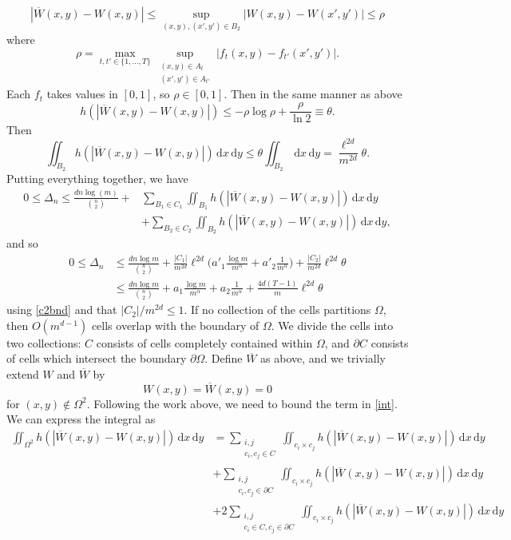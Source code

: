 \documentclass{svproc}
\newcommand{\1}{\mathbbm{1}}
\newcommand{\K}{\Omega}
\newcommand{\set}[1]{\{ #1\}}
\newcommand{\ol}[1]{\overline{#1}}
\newcommand{\dd}{\,\mathrm{d}}
\newcommand{\abs}[1]{| #1 |}
\begin{document}
\begin{equation}|\ol{W}(x,y) - W(x,y)|\leq\sup_{(x,y),(x',y')\in B_2}\abs{W(x,y)-W(x',y')}\leq\rho\end{equation}
where
\begin{equation}\rho = \max_{t,t'\in\set{1,\dots,T}}\sup_{\substack{(x,y)\in A_t\\(x',y')\in A_{t'}}}\abs{f_t(x,y) - f_{t'}(x',y')}.\end{equation}
Each $f_t$ takes values in $[0,1]$, so $\rho\in[0,1]$. Then in the same manner as above
\begin{equation}h(|\ol{W}(x,y)-W(x,y)|)\leq -\rho\log\rho +\frac{\rho}{\ln 2}\equiv \theta.\end{equation}
Then
\begin{equation}\iint_{B_2}h(|\ol{W}(x,y)-W(x,y)|)\dd x\dd y\leq\theta\iint_{B_2}\dd x\dd y = \frac{\ell^{2d}}{m^{2d}}\theta.\end{equation}
Putting everything together, we have
\begin{align*}
0\leq\Delta_n\leq\frac{dn\log(m)}{\binom{n}{2}}+&\sum_{B_1\in C_1}\iint_{B_1}h(|\ol{W}(x,y)-W(x,y)|)\dd x\dd y\\ &+\sum_{B_2\in C_2}\iint_{B_2}h(|\ol{W}(x,y)-W(x,y)|)\dd x\dd y,
\end{align*}
and so
\begin{align*}
0\leq\Delta_n&\leq\frac{dn\log m}{\binom n2} +\frac{|C_1|}{m^{2d}}\ell^{2d}\Big(a'_1 \frac{\log m}{m^\alpha}+a'_2 \frac{1}{m^\alpha}\Big)+\frac{|C_2|}{m^{2d}}\ell^{2d}\theta\\
&\leq\frac{dn\log m}{\binom n2} +a_1 \frac{\log m}{m^\alpha}+a_2 \frac{1}{m^\alpha}+\frac{4d(T-1)}{m}\ell^{2d}\theta
\end{align*}
using \cref{c2bnd} and that $|C_2|/m^{2d}\leq 1$. 
If no collection of the cells partitions $\K$, then $O(m^{d-1})$ cells overlap with the boundary of $\K$. We divide the cells into two collections: $C$ consists of cells completely contained within $\K$, and $\partial C$ consists of cells which intersect the boundary $\partial\K$. Define $\ol{W}$ as above, and we trivially extend $W$ and $\ol{W}$ by
\begin{equation}W(x,y)=\ol{W}(x,y) = 0\end{equation}
for  $(x,y)\notin\K^2$. Following the work above, we need to bound the term in \cref{int}. We can express the integral as
\begin{align*}
\iint_{\K^2}h(|\ol{W}(x,y)-W(x,y)|)\dd x\dd y &=\sum_{\substack{i,j\\ c_i,c_j\in C}}\iint_{c_i\times c_j}h(|\ol{W}(x,y)-W(x,y)|)\dd x\dd y\\
&+\sum_{\substack{i,j\\ c_i,c_j\in\partial C}}\iint_{c_i\times c_j}h(|\ol{W}(x,y)-W(x,y)|)\dd x\dd y\\
&+2\sum_{\substack{i,j\\ c_i\in C, c_j\in\partial C}}\iint_{c_i\times c_j}h(|\ol{W}(x,y)-W(x,y)|)\dd x\dd y
\end{align*}
\end{document}
